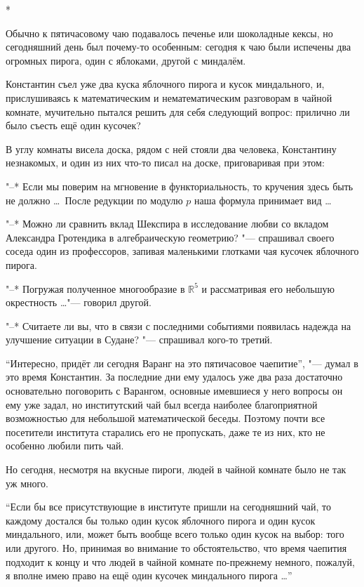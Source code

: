 \medskip
\begin{center}
*\quad*\quad*
\end{center}

\medskip
Обычно к пятичасовому чаю подавалось печенье или шоколадные кексы, но
сегодняшний день был почему-то особенным: сегодня к чаю были испечены два
огромных пирога, один с яблоками, другой с миндалём.

Константин съел уже два куска яблочного пирога и кусок миндального, и,
прислушиваясь к математическим и нематематическим разговорам в чайной комнате,
мучительно пытался решить для себя следующий вопрос: прилично ли было съесть ещё
один кусочек?

В углу комнаты висела доска, рядом с ней стояли два человека, Константину
незнакомых, и один из них что-то писал на доске, приговаривая при этом:

"--* Если мы поверим на мгновение в функториальность, то кручения здесь быть не
должно \ldots\
После редукции по модулю $p$ наша формула принимает вид \ldots

"--* Можно ли сравнить вклад Шекспира в исследование любви со вкладом Александра
Гротендика в алгебраическую геометрию? "--- спрашивал своего соседа один из
профессоров, запивая маленькими глотками чая кусочек яблочного пирога.

"--* Погружая полученное многообразие в $\mathbb{R}^5$ и рассматривая его
небольшую окрестность \ldots "--- говорил другой.

"--* Считаете ли вы, что в связи с последними событиями появилась надежда на
улучшение ситуации в Судане? "--- спрашивал кого-то третий.

\enquote{Интересно, придёт ли сегодня Варанг на это пятичасовое чаепитие}, "---
думал в это время Константин.
За последние дни ему удалось уже два раза достаточно основательно поговорить с
Варангом, основные имевшиеся у него вопросы он ему уже задал, но институтский
чай был всегда наиболее благоприятной возможностью для небольшой математической
беседы.
Поэтому почти все посетители института старались его не пропускать, даже те из
них, кто не особенно любили пить чай.

Но сегодня, несмотря на вкусные пироги, людей в чайной комнате было не так уж
много.

\enquote{Если бы все присутствующие в институте пришли на сегодняшний чай, то
каждому достался бы только один кусок яблочного пирога и один кусок миндального,
или, может быть вообще всего только один кусок на выбор: того или другого.
Но, принимая во внимание то обстоятельство, что время чаепития подходит к концу
и что людей в чайной комнате по-прежнему немного, пожалуй, я вполне имею право
на ещё один кусочек миндального пирога \ldots}

